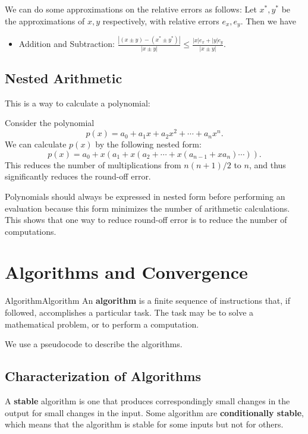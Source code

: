 \documentclass[../main.tex]{subfiles}
\begin{document}
We can do some approximations on the relative errors as follows: Let $x^*, y^*$ be the approximations of $x,y$ respectively, with relative errors $e_x, e_y$. Then we have
\begin{itemize}
  \item Addition and Subtraction: $\displaystyle \frac{|(x\pm y) - (x^* \pm y^*)|}{|x \pm y|} \leq \frac{|x| e_x + |y| e_y}{|x \pm y|}$.
\end{itemize}

\subsection{Nested Arithmetic}
This is a way to calculate a polynomial:

Consider the polynomial
\begin{equation}
  p(x) = a_0 + a_1 x + a_2 x^2 + \cdots + a_n x^n.
\end{equation}
We can calculate $p(x)$ by the following nested form:
\begin{equation}
  p(x) = a_0 + x(a_1 + x(a_2 + \cdots + x(a_{n-1} + x a_n) \cdots)).
\end{equation}
This reduces the number of multiplications from $n(n+1)/2$ to $n$, and thus significantly reduces the round-off error.

\begin{remark}
  Polynomials should always be expressed in nested form before performing an evaluation because this form minimizes the number of arithmetic calculations. This shows that one way to reduce round-off error is to reduce the number of computations.
\end{remark}

\section{Algorithms and Convergence}
\begin{definition}{Algorithm}{Algorithm}
  An \textbf{algorithm} is a finite sequence of instructions that, if followed, accomplishes a particular task. The task may be to solve a mathematical problem, or to perform a computation.
\end{definition}
We use a pseudocode to describe the algorithms. 

\subsection{Characterization of Algorithms}
A \textbf{stable} algorithm is one that produces correspondingly small changes in the output for small changes in the input. Some algorithm are \textbf{conditionally stable}, which means that the algorithm is stable for some inputs but not for others.
\end{document}
